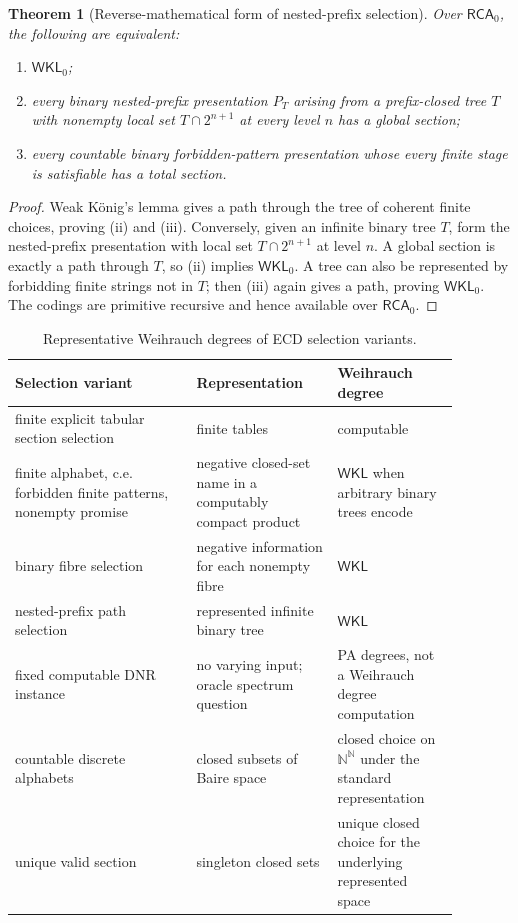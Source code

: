 \documentclass[11pt]{article}
\theoremstyle{plain}
\newtheorem{theorem}{Theorem}[section]
\theoremstyle{definition}
\theoremstyle{remark}
\newcommand{\N}{\mathbb{N}}
\begin{document}
\begin{theorem}[Reverse-mathematical form of nested-prefix selection]
\label{thm:reverse-math-nested-prefix}
Over $\mathsf{RCA}_0$, the following are equivalent:
\begin{enumerate}[label=(\roman*)]
\item $\mathsf{WKL}_0$;
\item every binary nested-prefix presentation $P_T$ arising from a prefix-closed
tree $T$ with nonempty local set $T\cap2^{n+1}$ at every level $n$ has a global
section;
\item every countable binary forbidden-pattern presentation whose every finite
stage is satisfiable has a total section.
\end{enumerate}
\end{theorem}

\begin{proof}
Weak König's lemma gives a path through the tree of coherent finite choices,
proving (ii) and (iii). Conversely, given an infinite binary tree $T$, form the
nested-prefix presentation with local set $T\cap2^{n+1}$ at level $n$. A global
section is exactly a path through $T$, so (ii) implies $\mathsf{WKL}_0$. A tree
can also be represented by forbidding finite strings not in $T$; then (iii)
again gives a path, proving $\mathsf{WKL}_0$. The codings are primitive
recursive and hence available over $\mathsf{RCA}_0$.
\end{proof}

\begin{table}[htbp]
\centering
\caption{Representative Weihrauch degrees of ECD selection variants.}
\label{tab:weihrauch-classification}
\begin{tabular}{@{}p{0.36\linewidth}p{0.28\linewidth}p{0.24\linewidth}@{}}
\toprule
Selection variant & Representation & Weihrauch degree\\
\midrule
finite explicit tabular section selection & finite tables & computable\\
finite alphabet, c.e. forbidden finite patterns, nonempty promise & negative closed-set name in a computably compact product & $\mathsf{WKL}$ when arbitrary binary trees encode\\
binary fibre selection & negative information for each nonempty fibre & $\mathsf{WKL}$\\
nested-prefix path selection & represented infinite binary tree & $\mathsf{WKL}$\\
fixed computable DNR instance & no varying input; oracle spectrum question & PA degrees, not a Weihrauch degree computation\\
countable discrete alphabets & closed subsets of Baire space & closed choice on $\N^\N$ under the standard representation\\
unique valid section & singleton closed sets & unique closed choice for the underlying represented space\\
\bottomrule
\end{tabular}
\end{table}
\end{document}
